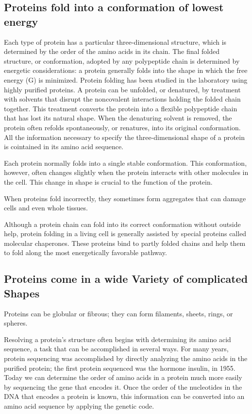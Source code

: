 \subsection{Proteins fold into a conformation of lowest energy}

Each type of protein has a particular three-dimensional structure, which
is determined by the order of the amino acids in its chain. The final folded
structure, or conformation, adopted by any polypeptide chain is determined 
by energetic considerations: a protein generally folds into the
shape in which the free energy (G) is minimized. Protein folding 
has been studied in the laboratory using highly purified proteins. A
protein can be unfolded, or denatured, by treatment with solvents that
disrupt the noncovalent interactions holding the folded chain together.
This treatment converts the protein into a flexible polypeptide chain that
has lost its natural shape. When the denaturing solvent is removed, the
protein often refolds spontaneously, or renatures, into its original conformation.
All the information necessary to specify the three-dimensional shape of a protein 
is cointained in its amino acid sequence.

Each protein normally folds into a single stable conformation. This conformation, 
however, often changes slightly when the protein interacts
with other molecules in the cell. This change in shape is crucial to the
function of the protein.

When proteins fold incorrectly, they sometimes form aggregates that can
damage cells and even whole tissues.

Although a protein chain can fold into its correct conformation without
outside help, protein folding in a living cell is generally assisted by special
proteins called molecular chaperones. These proteins bind to partly folded
chains and help them to fold along the most energetically favorable pathway.

\subsection{Proteins come in a wide Variety of complicated Shapes}

Proteins can be globular or fibrous; they can form filaments, sheets,
rings, or spheres.

Resolving a protein’s structure often begins with determining its amino
acid sequence, a task that can be accomplished in several ways. For
many years, protein sequencing was accomplished by directly analyzing 
the amino acids in the purified protein; the first protein sequenced
was the hormone insulin, in 1955. Today we can determine the order of
amino acids in a protein much more easily by sequencing the gene that
encodes it. Once the order of the nucleotides
in the DNA that encodes a protein is known, this information can be
converted into an amino acid sequence by applying the genetic code.

